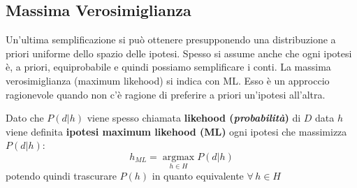\subsection{Massima Verosimiglianza}
Un'ultima semplificazione si può ottenere presupponendo una distribuzione a priori uniforme dello spazio delle ipotesi. Spesso si assume anche che ogni ipotesi è, a priori, equiprobabile e quindi possiamo semplificare i conti. La massima verosimiglianza (maximum likehood) si indica con ML. Esso è un approccio ragionevole quando non c'è ragione di preferire a priori un'ipotesi all'altra.
\begin{definizione}
  Dato che $P(d|h)$ viene spesso chiamata \textbf{likehood
    (\textit{probabilità})} di $D$ data $h$ viene definita \textbf{ipotesi
    maximum likehood (ML)} ogni ipotesi che massimizza $P(d|h)$:
  \[h_{ML}=\operatorname*{argmax}_{h\in H}P(d|h)\]
  potendo quindi trascurare $P(h)$ in quanto equivalente $\forall\, h\in H$
\end{definizione}
